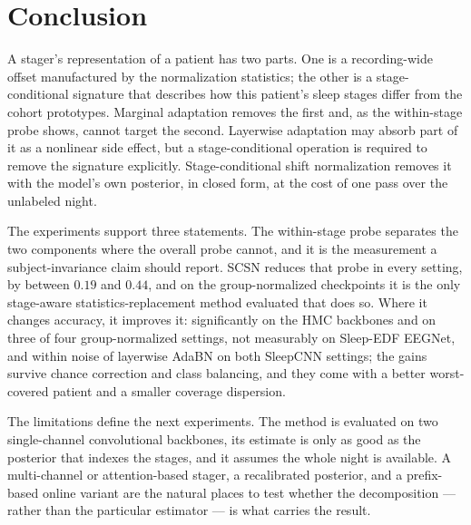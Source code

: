 \section{Conclusion}
\label{sec:conclusion}

A stager's representation of a patient has two parts. One is a recording-wide
offset manufactured by the normalization statistics; the other is a
stage-conditional signature that describes how this patient's sleep stages
differ from the cohort prototypes. Marginal adaptation removes the first and,
as the within-stage probe shows, cannot target the second. Layerwise
adaptation may absorb part of it as a nonlinear side effect, but a
stage-conditional operation is required to remove the signature explicitly.
Stage-conditional shift normalization removes it with the model's own
posterior, in closed form, at the cost of one pass over the unlabeled night.

The experiments support three statements. The within-stage probe separates the
two components where the overall probe cannot, and it is the measurement a
subject-invariance claim should report. SCSN reduces that probe in every
setting, by between $0.19$ and $0.44$, and on the group-normalized checkpoints
it is the only stage-aware statistics-replacement method evaluated that does
so. Where it changes accuracy, it improves
it: significantly on the HMC backbones and on three of four group-normalized
settings, not measurably on Sleep-EDF EEGNet, and within noise of layerwise
AdaBN on both SleepCNN settings; the gains survive chance correction and class
balancing, and they come with a better worst-covered patient and a smaller
coverage dispersion.

The limitations define the next experiments. The method is evaluated on two
single-channel convolutional backbones, its estimate is only as good as the
posterior that indexes the stages, and it assumes the whole night is available.
A multi-channel or attention-based stager, a recalibrated posterior, and a
prefix-based online variant are the natural places to test whether the
decomposition --- rather than the particular estimator --- is what carries the
result.
